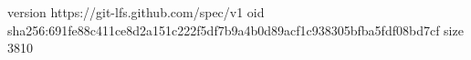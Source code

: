 version https://git-lfs.github.com/spec/v1
oid sha256:691fe88c411ce8d2a151c222f5df7b9a4b0d89acf1c938305bfba5fdf08bd7cf
size 3810
